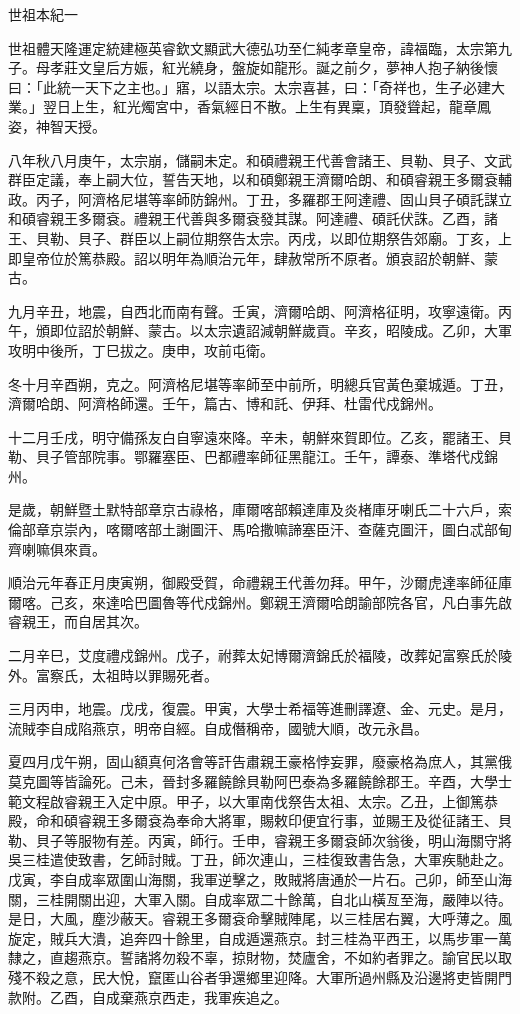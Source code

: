 
\begin{pinyinscope}
世祖本紀一

世祖體天隆運定統建極英睿欽文顯武大德弘功至仁純孝章皇帝，諱福臨，太宗第九子。母孝莊文皇后方娠，紅光繞身，盤旋如龍形。誕之前夕，夢神人抱子納後懷曰：「此統一天下之主也。」寤，以語太宗。太宗喜甚，曰：「奇祥也，生子必建大業。」翌日上生，紅光燭宮中，香氣經日不散。上生有異稟，頂發聳起，龍章鳳姿，神智天授。

八年秋八月庚午，太宗崩，儲嗣未定。和碩禮親王代善會諸王、貝勒、貝子、文武群臣定議，奉上嗣大位，誓告天地，以和碩鄭親王濟爾哈朗、和碩睿親王多爾袞輔政。丙子，阿濟格尼堪等率師防錦州。丁丑，多羅郡王阿達禮、固山貝子碩託謀立和碩睿親王多爾袞。禮親王代善與多爾袞發其謀。阿達禮、碩託伏誅。乙酉，諸王、貝勒、貝子、群臣以上嗣位期祭告太宗。丙戌，以即位期祭告郊廟。丁亥，上即皇帝位於篤恭殿。詔以明年為順治元年，肆赦常所不原者。頒哀詔於朝鮮、蒙古。

九月辛丑，地震，自西北而南有聲。壬寅，濟爾哈朗、阿濟格征明，攻寧遠衛。丙午，頒即位詔於朝鮮、蒙古。以太宗遺詔減朝鮮歲貢。辛亥，昭陵成。乙卯，大軍攻明中後所，丁巳拔之。庚申，攻前屯衛。

冬十月辛酉朔，克之。阿濟格尼堪等率師至中前所，明總兵官黃色棄城遁。丁丑，濟爾哈朗、阿濟格師還。壬午，篇古、博和託、伊拜、杜雷代戍錦州。

十二月壬戌，明守備孫友白自寧遠來降。辛未，朝鮮來賀即位。乙亥，罷諸王、貝勒、貝子管部院事。鄂羅塞臣、巴都禮率師征黑龍江。壬午，譚泰、準塔代戍錦州。

是歲，朝鮮暨土默特部章京古祿格，庫爾喀部賴達庫及炎楮庫牙喇氏二十六戶，索倫部章京崇內，喀爾喀部土謝圖汗、馬哈撒嘛諦塞臣汗、查薩克圖汗，圖白忒部甸齊喇嘛俱來貢。

順治元年春正月庚寅朔，御殿受賀，命禮親王代善勿拜。甲午，沙爾虎達率師征庫爾喀。己亥，來達哈巴圖魯等代戍錦州。鄭親王濟爾哈朗諭部院各官，凡白事先啟睿親王，而自居其次。

二月辛巳，艾度禮戍錦州。戊子，祔葬太妃博爾濟錦氏於福陵，改葬妃富察氏於陵外。富察氏，太祖時以罪賜死者。

三月丙申，地震。戊戌，復震。甲寅，大學士希福等進刪譯遼、金、元史。是月，流賊李自成陷燕京，明帝自經。自成僭稱帝，國號大順，改元永昌。

夏四月戊午朔，固山額真何洛會等訐告肅親王豪格悖妄罪，廢豪格為庶人，其黨俄莫克圖等皆論死。己未，晉封多羅饒餘貝勒阿巴泰為多羅饒餘郡王。辛酉，大學士範文程啟睿親王入定中原。甲子，以大軍南伐祭告太祖、太宗。乙丑，上御篤恭殿，命和碩睿親王多爾袞為奉命大將軍，賜敕印便宜行事，並賜王及從征諸王、貝勒、貝子等服物有差。丙寅，師行。壬申，睿親王多爾袞師次翁後，明山海關守將吳三桂遣使致書，乞師討賊。丁丑，師次連山，三桂復致書告急，大軍疾馳赴之。戊寅，李自成率眾圍山海關，我軍逆擊之，敗賊將唐通於一片石。己卯，師至山海關，三桂開關出迎，大軍入關。自成率眾二十餘萬，自北山橫亙至海，嚴陣以待。是日，大風，塵沙蔽天。睿親王多爾袞命擊賊陣尾，以三桂居右翼，大呼薄之。風旋定，賊兵大潰，追奔四十餘里，自成遁還燕京。封三桂為平西王，以馬步軍一萬隸之，直趨燕京。誓諸將勿殺不辜，掠財物，焚廬舍，不如約者罪之。諭官民以取殘不殺之意，民大悅，竄匿山谷者爭還鄉里迎降。大軍所過州縣及沿邊將吏皆開門款附。乙酉，自成棄燕京西走，我軍疾追之。


\end{pinyinscope}
